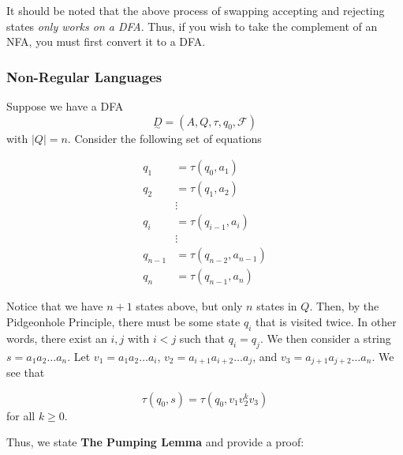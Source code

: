 It should be noted that the above process of swapping accepting and rejecting states \textit{only works on a DFA}. Thus, if you wish to take the complement of an NFA, you must first convert it to a DFA. 

\subsubsection{Non-Regular Languages}
Suppose we have a DFA \[\underset{\sim}{D}=(A, Q, \tau, q_0, \mathcal{F})\] with \(|Q|=n\). Consider the following set of equations

\begin{align*}
      q_1 &= \tau(q_0, a_1)\\
      q_2 &= \tau(q_1, a_2)\\
          &\vdots\\
      q_i &= \tau(q_{i-1}, a_i)\\
          &\vdots\\
      q_{n-1} &= \tau(q_{n-2}, a_{n-1})\\
      q_n &= \tau(q_{n-1}, a_n)
\end{align*}

Notice that we have \(n+1\) states above, but only \(n\) states in \(Q\). Then, by the Pidgeonhole Principle, there must be some state \(q_i\) that is visited twice. In other words, there exist an \(i, j\) with \(i < j\) such that \(q_i=q_j\). We then consider a string \(s=a_1a_2\hdots a_n\). Let \(v_1=a_1a_2\hdots a_i\), \(v_2=a_{i+1}a_{i+2}\hdots a_j\), and \(v_3=a_{j+1}a_{j+2}\hdots a_n\). We see that 

\[\tau(q_0, s)=\tau(q_0, v_1v_2^kv_3)\] for all \(k\geq0\). 

\begin{center}\end{center}

Thus, we state \textbf{The Pumping Lemma} and provide a proof:

